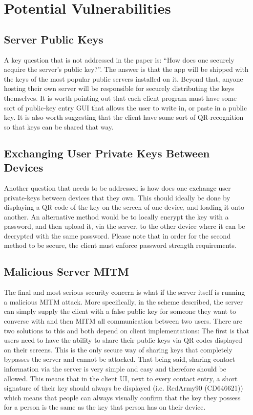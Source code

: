 \documentclass{article}
\begin{document}
\section{Potential Vulnerabilities}

\subsection{Server Public Keys}

A key question that is not addressed in the paper is: ``How does one securely acquire the server's public key?''. The answer is that the app will be shipped with the keys of the most popular public servers installed on it. Beyond that, anyone hosting their own server will be responsible for securely distributing the keys themselves. It is worth pointing out that each client program must have some sort of public-key entry GUI that allows the user to write in, or paste in a public key. It is also worth suggesting that the client have some sort of QR-recognition so that keys can be shared that way.

\subsection{Exchanging User Private Keys Between Devices}

Another question that needs to be addressed is how does one exchange user private-keys between devices that they own. This should ideally be done by displaying a QR code of the key on the screen of one device, and loading it onto another. An alternative method would be to locally encrypt the key with a password, and then upload it, via the server, to the other device where it can be decrypted with the same password. Please note that in order for the second method to be secure, the client must enforce password strength requirements.

\subsection{Malicious Server MITM}

The final and most serious security concern is what if the server itself is running a malicious MITM attack. More specifically, in the scheme described, the server can simply supply the client with a false public key for someone they want to converse with and then MITM all communication between two users. There are two solutions to this and both depend on client implementations: The first is that users need to have the ability to share their public keys via QR codes displayed on their screens. This is the only secure way of sharing keys that completely bypasses the server and cannot be attacked. That being said, sharing contact information via the server is very simple and easy and therefore should be allowed. This means that in the client UI, next to every contact entry, a short signature of their key should always be displayed (i.e. RedArmy90 (CD646621)) which means that people can always visually confirm that the key they possess for a person is the same as the key that person has on their device.
\end{document}
